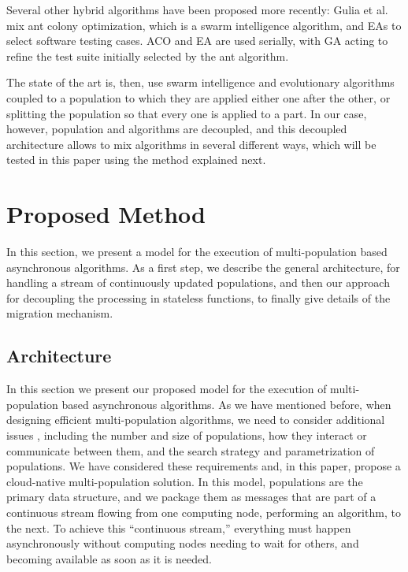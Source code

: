 Several other hybrid algorithms have been proposed more recently:
Gulia et al. \cite{gulia2019hybrid} mix ant colony optimization, 
which is a swarm intelligence algorithm, and EAs to select
software testing cases. ACO and EA are used serially, with GA acting
to refine the test suite initially selected by the ant algorithm.

The state of the art is, then, use swarm intelligence and evolutionary
algorithms coupled to a population to which they are applied either
one after the other, or splitting the population so that every one is
applied to a part. In our case, however, population and algorithms are
decoupled, and this decoupled architecture allows to mix algorithms in
several different ways, which will be tested in this paper using the
method explained next.


\section{Proposed Method}
\label{method}
%
% 
In this section, we present a model for the execution of multi-population based
asynchronous algorithms. As a first step, we describe the general architecture,
for handling a stream of continuously updated populations,  and then our
approach for decoupling the processing in stateless functions, to finally give
details of the migration mechanism.


\subsection{Architecture}
\label{arch}

In this section we present our proposed model for the execution of
multi-population based asynchronous algorithms. As we have mentioned before, when
designing efficient multi-population algorithms, we need to consider additional
issues \cite{Ma2019}, including the number and size of populations, how they
interact or communicate between them, and the search strategy and parametrization of
populations. We have considered these requirements and, in this paper,
propose a cloud-native
multi-population solution. In this model, populations are the primary data
structure, and we package them as messages that are part of a continuous stream flowing
from one computing node, performing an algorithm, to the next. To achieve this ``continuous stream,''
everything must happen asynchronously without computing nodes needing to wait for
others, and becoming available as soon as it is needed.

